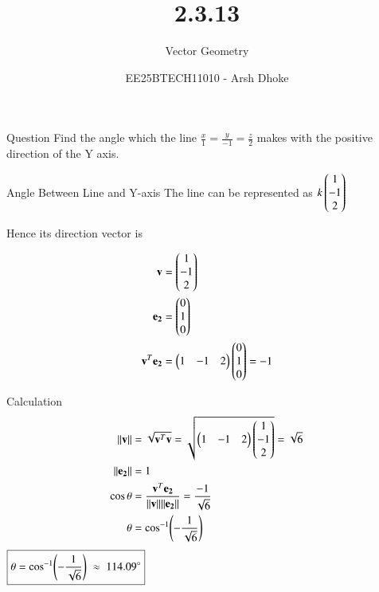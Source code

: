\documentclass{beamer}
\title{2.3.13}
\subtitle{Vector Geometry}
\author{EE25BTECH11010 - Arsh Dhoke}
\date{}
\begin{document}
\begin{frame}
\titlepage
\end{frame}

\begin{frame}{Question}
Find the angle which the line $\frac{x}{1}=\frac{y}{-1}=\frac{z}{2}$ makes with the positive direction of the Y axis.
\end{frame}

\begin{frame}{Angle Between Line and Y-axis}
The line can be represented as 
$
k \begin{pmatrix}1\\-1\\2\end{pmatrix}
$

Hence its direction vector is

\begin{align}
\mathbf{v} &= \begin{pmatrix}1\\-1\\2\end{pmatrix} \\
\mathbf{e_2} &= \begin{pmatrix}0\\1\\0\end{pmatrix} \\
\mathbf{v}^T\mathbf{e_2} &= 
\begin{pmatrix}1 & -1 & 2\end{pmatrix}\begin{pmatrix}0\\1\\0\end{pmatrix}=-1 
\end{align}
\end{frame}

\begin{frame}{Calculation}
\begin{align}
\|\mathbf{v}\| &= 
\sqrt{\mathbf{v}^T\mathbf{v}}
=\sqrt{\begin{pmatrix}1 & -1 & 2\end{pmatrix}\begin{pmatrix}1\\-1\\2\end{pmatrix}}=\sqrt{6} \\
\|\mathbf{e_2}\| &=1 \\
\cos\theta &= 
\frac{\mathbf{v}^T\mathbf{e_2}}{\|\mathbf{v}\|\|\mathbf{e_2}\|}
=\frac{-1}{\sqrt{6}} \\
\theta &= \cos^{-1}\!\left(-\frac{1}{\sqrt{6}}\right)
\end{align}
$
\boxed{\theta=\cos^{-1}\!\left(-\frac{1}{\sqrt{6}}\right)\;\approx\;114.09\degree}
$
\end{frame}
\end{document}
